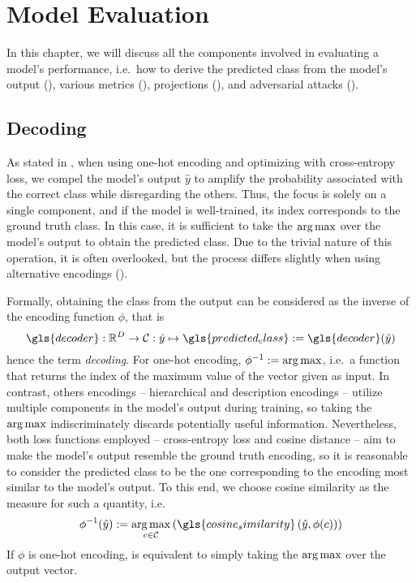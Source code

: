 \chapter{Model Evaluation}
\label{ch:model-evaluation}

In this chapter, we will discuss all the components involved in evaluating a model's performance, i.e.\ how to derive the predicted class from the model's output (), various metrics (), projections (), and adversarial attacks ().

\section{Decoding}
\label{sec:decoding}

As stated in , when using one-hot encoding and optimizing with cross-entropy loss, we compel the model's output $\hat{y}$ to amplify the probability associated with the correct class while disregarding the others. Thus, the focus is solely on a single component, and if the model is well-trained, its index corresponds to the ground truth class. In this case, it is sufficient to take the $\operatorname*{arg\,max}$ over the model's output to obtain the predicted class.
Due to the trivial nature of this operation, it is often overlooked, but the process differs slightly when using alternative encodings ().\medskip

Formally, obtaining the class from the output can be considered as the inverse of the encoding function $\phi$, that is
\begin{equation}
  \gls{decoder} : \mathbb{R}^{D} \to \mathcal{C}
  : \hat{y} \mapsto \gls{predicted_class} := \gls{decoder}(\hat{y})
  \label{eq:decoding}
\end{equation}
hence the term \emph{decoding}.
For one-hot encoding, $\phi^{-1} := \operatorname*{arg\,max}$, i.e.\ a function that returns the index of the maximum value of the vector given as input. In contrast, others encodings -- hierarchical and description encodings -- utilize multiple components in the model's output during training, so taking the $\operatorname*{arg\,max}$ indiscriminately discards potentially useful information. Nevertheless, both loss functions employed -- cross-entropy loss and cosine distance -- aim to make the model's output resemble the ground truth encoding, so it is reasonable to consider the predicted class to be the one corresponding to the encoding most similar to the model's output.
To this end, we choose cosine similarity as the measure for such a quantity, i.e.\
\begin{equation}
  \phi^{-1}(\hat{y}) := \argmax_{c \in \mathcal{C}}
  \left( \gls{cosine_similarity} \left(\hat{y}, \phi(c) \right) \right)
  \label{eq:decoding-cos-sim}
\end{equation}
If $\phi$ is one-hot encoding,  is equivalent to simply taking the $\operatorname*{arg\,max}$ over the output vector.

